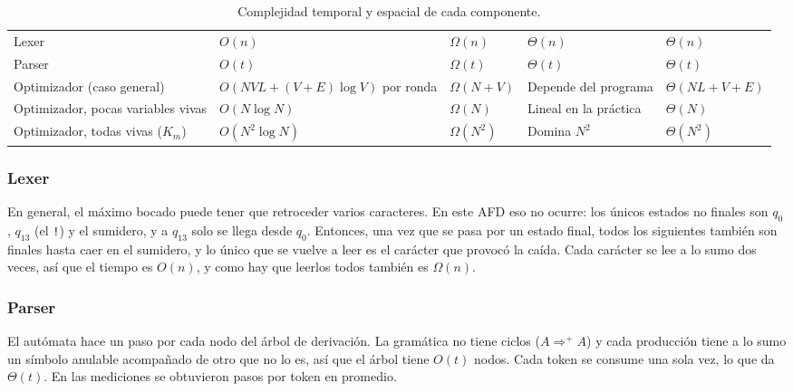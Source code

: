 \documentclass[11pt,a4paper]{article}
\newenvironment{grilla}{\footnotesize\renewcommand{\arraystretch}{1.45}\setlength{\tabcolsep}{5pt}}{}
\theoremstyle{definition}
\newcommand{\tm}[1]{\texttt{#1}}
\renewcommand{\paragraph}[1]{\subsubsection*{#1}}
\begin{document}
\begin{table}[H]
\centering
\begin{grilla}
\begin{tabular}{|L{3.1cm}|L{3.1cm}|L{2.1cm}|L{2.6cm}|L{2.3cm}|}
\hline
{} &  & \thead{$\Omega$} & \thead{$\Theta$} &  \\ \hline
Lexer & $O(n)$ & $\Omega(n)$ & $\Theta(n)$ & $\Theta(n)$ \\ \hline
Parser & $O(t)$ & $\Omega(t)$ & $\Theta(t)$ & $\Theta(t)$ \\ \hline
Optimizador (caso general) & $O(N V L + (V{+}E)\log V)$ por ronda & $\Omega(N + V)$ & Depende del programa & $\Theta(N L + V + E)$ \\ \hline
Optimizador, pocas variables vivas & $O(N \log N)$ & $\Omega(N)$ & Lineal en la práctica & $\Theta(N)$ \\ \hline
Optimizador, todas vivas ($K_m$) & $O(N^2 \log N)$ & $\Omega(N^2)$ & Domina $N^2$ & $\Theta(N^2)$ \\ \hline
\end{tabular}
\end{grilla}
\caption{Complejidad temporal y espacial de cada componente.}
\label{tab:complejidad}
\end{table}

\paragraph{Lexer}

En general, el máximo bocado puede tener que retroceder varios caracteres.
En este AFD eso no ocurre: los únicos estados no finales son $q_0$,
$q_{13}$ (el \tm{!}) y el sumidero, y a $q_{13}$ solo se llega desde $q_0$.
Entonces, una vez que se pasa por un estado final, todos los siguientes
también son finales hasta caer en el sumidero, y lo único que se vuelve a
leer es el carácter que provocó la caída. Cada carácter se lee a lo sumo dos
veces, así que el tiempo es $O(n)$, y como hay que leerlos todos también es
$\Omega(n)$.

\paragraph{Parser}

El autómata hace un paso por cada nodo del árbol de derivación. La gramática
no tiene ciclos ($A \Rightarrow^{+} A$) y cada producción tiene a lo sumo un
símbolo anulable acompañado de otro que no lo es, así que el árbol tiene
$O(t)$ nodos. Cada token se consume una sola vez, lo que da $\Theta(t)$. En
las mediciones se obtuvieron \PasosPorToken{} pasos por token en promedio.
\end{document}
